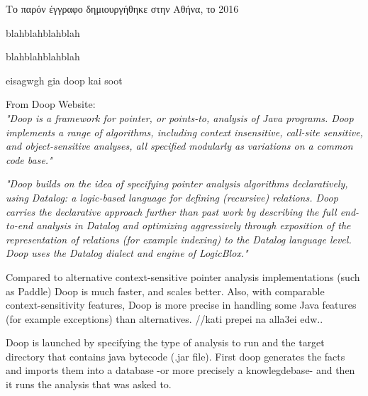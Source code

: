 \documentclass{dithesis}
\begin{document}
\tableofcontents
\listoffigures
\listoftables
{}


\begin{thesisprologue}[PROLOGUE]
    Το παρόν έγγραφο δημιουργήθηκε στην Αθήνα, το 2016 
    
    blahblahblahblah

    blahblahblahblah
\end{thesisprologue}

    eisagwgh gia doop kai soot

	From Doop Website: \\
    \textit{"Doop is a framework for pointer, or points-to, analysis of Java programs. Doop implements a range of algorithms, including context insensitive, call-site sensitive, and object-sensitive analyses, all specified modularly as variations on a common code base."}

    \textit{"Doop builds on the idea of specifying pointer analysis algorithms declaratively, using Datalog: a logic-based language for defining (recursive) relations. Doop carries the declarative approach further than past work by describing the full end-to-end analysis in Datalog and optimizing aggressively through exposition of the representation of relations (for example indexing) to the Datalog language level. Doop uses the Datalog dialect and engine of LogicBlox."} 
    
    Compared to alternative context-sensitive pointer analysis implementations (such as Paddle) Doop is much faster, and scales better. Also, with comparable context-sensitivity features, Doop is more precise in handling some Java features (for example exceptions) than alternatives. //kati prepei na alla3ei edw..

    Doop is launched by specifying the type of analysis to run and the target directory that contains java bytecode (.jar file). First doop generates the facts and imports them into a database -or more precisely a knowlegdebase- and then it runs the analysis that was asked to. \cite{Doop: Framework for Java Pointer Analysis}
\end{document}
